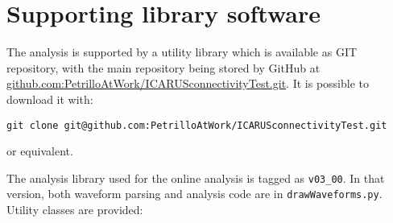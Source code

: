\section{Supporting library software}
\label{app:supporting-library-software}

The analysis is supported by a utility library which is available as GIT
repository, with the main repository being stored by GitHub at
\url{github.com:PetrilloAtWork/ICARUSconnectivityTest.git}. It is
possible to download it with:
\begin{verbatim}
git clone git@github.com:PetrilloAtWork/ICARUSconnectivityTest.git
\end{verbatim}
or equivalent.

The analysis library used for the online analysis is tagged as
\texttt{v03\_00}. In that version, both waveform parsing and analysis
code are in \texttt{drawWaveforms.py}.\\
Utility classes are provided:
